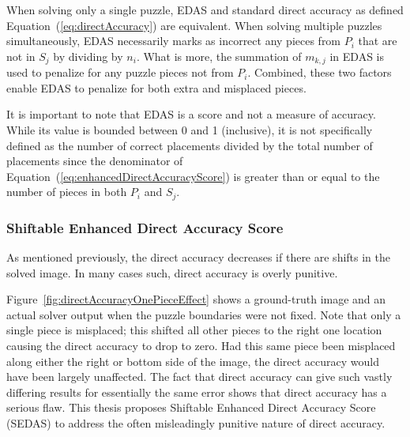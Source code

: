 \documentclass{report}
\def\eref#1{(\ref{#1})}
\begin{document}
When solving only a single puzzle, EDAS and standard direct accuracy as defined Equation~\eref{eq:directAccuracy} are equivalent.  When solving multiple puzzles simultaneously, EDAS necessarily marks as incorrect any pieces from $P_i$ that are not in $S_j$ by dividing by $n_i$.  What is more, the summation of $m_{k,j}$ in EDAS is used to penalize for any puzzle pieces not from $P_i$.  Combined, these two factors enable EDAS to penalize for both extra and misplaced pieces.

It is important to note that EDAS is a score and not a measure of accuracy. While its value is bounded between 0 and 1 (inclusive), it is not specifically defined as the number of correct placements divided by the total number of placements since the denominator of Equation~\eref{eq:enhancedDirectAccuracyScore} is greater than or equal to the number of pieces in both $P_i$ and $S_j$.

\subsubsection{Shiftable Enhanced Direct Accuracy Score}\label{sec:shiftableEnhancedDirectAccuracy}

As mentioned previously, the direct accuracy decreases if there are shifts in the solved image.  In many cases such, direct accuracy is overly punitive. 

Figure~\ref{fig:directAccuracyOnePieceEffect} shows a ground-truth image and an actual solver output when the puzzle boundaries were not fixed.  Note that only a single piece is misplaced; this shifted all other pieces to the right one location causing the direct accuracy to drop to zero.  Had this same piece been misplaced along either the right or bottom side of the image, the direct accuracy would have been largely unaffected.  The fact that direct accuracy can give such vastly differing results for essentially the same error shows that direct accuracy has a serious flaw.  This thesis proposes Shiftable Enhanced Direct Accuracy Score (SEDAS) to address the often misleadingly punitive nature of direct accuracy. 
\end{document}
